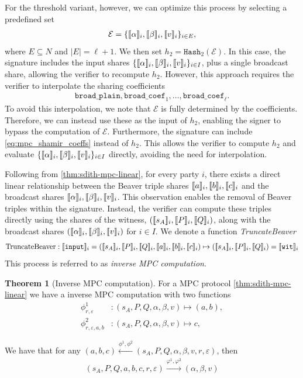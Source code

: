 \documentclass[11pt]{report}
\theoremstyle{definition}
\newtheorem{theorem}{Theorem}[section]
\theoremstyle{plain}
\begin{document}
\noindent
For the threshold variant, however, we can optimize this process by selecting a predefined set
\begin{align*}
  \mathcal{E} = \{\llbracket \alpha \rrbracket_i, \llbracket \beta \rrbracket_i, \llbracket v \rrbracket_i\}_{i \in E},
\end{align*}
where $E \subseteq N$ and $|E| = \ell + 1$. We then set $h_2 = \texttt{Hash}_2(\mathcal{E})$. In this case, the signature includes the input shares $\{\llbracket \alpha \rrbracket_i, \llbracket \beta \rrbracket_i, \llbracket v \rrbracket_i\}_{i \in I}$, plus a single broadcast share, allowing the verifier to recompute $h_2$. However, this approach requires the verifier to interpolate the sharing coefficients
\begin{align}
  \texttt{broad\_plain}, \texttt{broad\_coef}_1, \dots, \texttt{broad\_coef}_\ell.\label{eq:mpc_shamir_coeffs}
\end{align}
To avoid this interpolation, we note that $\mathcal{E}$ is fully determined by the coefficients. Therefore, we can instead use these as the input of $h_2$, enabling the signer to bypass the computation of $\mathcal{E}$. Furthermore, the signature can include \autoref{eq:mpc_shamir_coeffs} instead of $h_2$. This allows the verifier to compute $h_2$ and evaluate $\{\llbracket \alpha \rrbracket_i, \llbracket \beta \rrbracket_i, \llbracket v \rrbracket_i\}_{i \in I}$ directly, avoiding the need for interpolation.

Following from \autoref{thm:sdith-mpc-linear}, for every party $i$, there exists a direct linear relationship between the Beaver triple shares $\llbracket a \rrbracket_i, \llbracket b \rrbracket_i, \llbracket c \rrbracket_i$ and the broadcast shares $\llbracket \alpha \rrbracket_i, \llbracket \beta \rrbracket_i, \llbracket v \rrbracket_i$. This observation enables the removal of Beaver triples within the signature. Instead, the verifier can compute these triples directly using the shares of the witness, $(\llbracket s_A \rrbracket_i, \llbracket P \rrbracket_i, \llbracket Q \rrbracket_i)$, along with the broadcast shares $(\llbracket \alpha \rrbracket_i, \llbracket \beta \rrbracket_i, \llbracket v \rrbracket_i)$ for $i \in I$. We denote a function \textit{TruncateBeaver}
\begin{align}
  \text{TruncateBeaver} : \llbracket \texttt{input} \rrbracket_i = (\llbracket s_A \rrbracket_i, \llbracket P \rrbracket_i, \llbracket Q \rrbracket_i, \llbracket a \rrbracket_i, \llbracket b \rrbracket_i, \llbracket c \rrbracket_i) \mapsto (\llbracket s_A \rrbracket_i, \llbracket P \rrbracket_i, \llbracket Q \rrbracket_i) = \llbracket \texttt{wit} \rrbracket_i\label{eq:truncate_beaver}
\end{align}
This process is referred to as \textit{inverse MPC computation}.

\begin{theorem}[Inverse MPC computation]\label{thm:mpc_inverse}
  For a MPC protocol \autoref{thm:sdith-mpc-linear} we have a inverse MPC computation with two functions
  \begin{align}
    \phi^1_{r,\varepsilon}        & : (s_A, P, Q, \alpha, \beta, v) \mapsto (a, b), \\
    \phi^2_{r, \varepsilon, a, b} & : (s_A, P, Q, \alpha, \beta, v) \mapsto c,
  \end{align}

  We have that for any $(a,b,c) \stackrel{\phi^1, \phi^2}{\longleftarrow} (s_A, P, Q, \alpha, \beta, v, r, \varepsilon)$, then
  \begin{align*}
    (s_A, P, Q, a, b, c, r, \varepsilon) \stackrel{\varphi^1, \varphi^2}{\longrightarrow} (\alpha, \beta, v)
  \end{align*}
\end{theorem}
\end{document}
